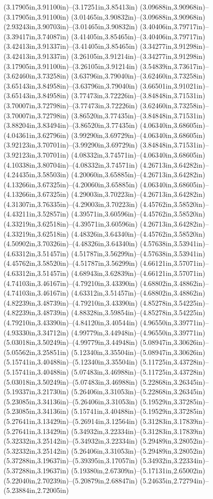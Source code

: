 (3.17905in,3.91100in)--(3.17251in,3.85413in) (3.09688in,3.90968in)--(3.17905in,3.91100in) (3.01465in,3.90832in)--(3.09688in,3.90968in) (2.93243in,3.90703in)--(3.01465in,3.90832in) (3.40406in,3.79717in)--(3.39417in,3.74087in) (3.41405in,3.85465in)--(3.40406in,3.79717in) (3.42413in,3.91337in)--(3.41405in,3.85465in) (3.34277in,3.91298in)--(3.42413in,3.91337in) (3.26105in,3.91214in)--(3.34277in,3.91298in) (3.17905in,3.91100in)--(3.26105in,3.91214in) (3.54839in,3.73617in)--(3.62460in,3.73258in) (3.63796in,3.79040in)--(3.62460in,3.73258in) (3.65143in,3.84958in)--(3.63796in,3.79040in) (3.66501in,3.91021in)--(3.65143in,3.84958in) (3.77473in,3.72226in)--(3.84848in,3.71531in) (3.70007in,3.72798in)--(3.77473in,3.72226in) (3.62460in,3.73258in)--(3.70007in,3.72798in) (3.86520in,3.77435in)--(3.84848in,3.71531in) (3.88204in,3.83494in)--(3.86520in,3.77435in) (4.06340in,3.68605in)--(4.04361in,3.62796in) (3.99290in,3.69729in)--(4.06340in,3.68605in) (3.92123in,3.70701in)--(3.99290in,3.69729in) (3.84848in,3.71531in)--(3.92123in,3.70701in) (4.08332in,3.74571in)--(4.06340in,3.68605in) (4.10338in,3.80704in)--(4.08332in,3.74571in) (4.26713in,3.64282in)--(4.24435in,3.58503in) (4.20060in,3.65885in)--(4.26713in,3.64282in) (4.13266in,3.67325in)--(4.20060in,3.65885in) (4.06340in,3.68605in)--(4.13266in,3.67325in) (4.29003in,3.70223in)--(4.26713in,3.64282in) (4.31307in,3.76335in)--(4.29003in,3.70223in) (4.45762in,3.58520in)--(4.43211in,3.52857in) (4.39571in,3.60596in)--(4.45762in,3.58520in) (4.33219in,3.62518in)--(4.39571in,3.60596in) (4.26713in,3.64282in)--(4.33219in,3.62518in) (4.48326in,3.64340in)--(4.45762in,3.58520in) (4.50902in,3.70326in)--(4.48326in,3.64340in) (4.57638in,3.53941in)--(4.63312in,3.51457in) (4.51787in,3.56299in)--(4.57638in,3.53941in) (4.45762in,3.58520in)--(4.51787in,3.56299in) (4.66121in,3.57071in)--(4.63312in,3.51457in) (4.68943in,3.62839in)--(4.66121in,3.57071in) (4.74103in,3.46167in)--(4.79210in,3.43390in) (4.68802in,3.48862in)--(4.74103in,3.46167in) (4.63312in,3.51457in)--(4.68802in,3.48862in) (4.82239in,3.48739in)--(4.79210in,3.43390in) (4.85278in,3.54225in)--(4.82239in,3.48739in) (4.88328in,3.59854in)--(4.85278in,3.54225in) (4.79210in,3.43390in)--(4.84120in,3.40544in) (4.96550in,3.39771in)--(4.93330in,3.34712in) (4.99779in,3.44948in)--(4.96550in,3.39771in) (5.03018in,3.50249in)--(4.99779in,3.44948in) (5.08947in,3.30626in)--(5.05562in,3.25851in) (5.12340in,3.35504in)--(5.08947in,3.30626in) (5.15741in,3.40488in)--(5.12340in,3.35504in) (5.11725in,3.43728in)--(5.15741in,3.40488in) (5.07483in,3.46988in)--(5.11725in,3.43728in) (5.03018in,3.50249in)--(5.07483in,3.46988in) (5.22868in,3.26345in)--(5.19337in,3.21730in) (5.26406in,3.31053in)--(5.22868in,3.26345in) (5.23085in,3.34136in)--(5.26406in,3.31053in) (5.19529in,3.37285in)--(5.23085in,3.34136in) (5.15741in,3.40488in)--(5.19529in,3.37285in) (5.27641in,3.13429in)--(5.26914in,3.12564in) (5.31283in,3.17839in)--(5.27641in,3.13429in) (5.34932in,3.22334in)--(5.31283in,3.17839in) (5.32332in,3.25142in)--(5.34932in,3.22334in) (5.29489in,3.28052in)--(5.32332in,3.25142in) (5.26406in,3.31053in)--(5.29489in,3.28052in) (5.37288in,3.19637in)--(5.39395in,3.17057in) (5.34932in,3.22334in)--(5.37288in,3.19637in) (5.19380in,2.67309in)--(5.17131in,2.65002in) (5.22040in,2.70239in)--(5.20879in,2.68847in) (5.24635in,2.72794in)--(5.23884in,2.72005in) 